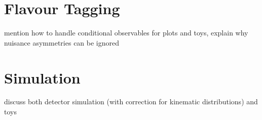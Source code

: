 \section{Flavour Tagging}
\label{sec:ana_tagging}
mention how to handle conditional observables for plots and toys,
explain why nuisance asymmetries can be ignored

\section{Simulation}
\label{sec:ana_sim}
discuss both detector simulation (with correction for kinematic distributions) and toys
